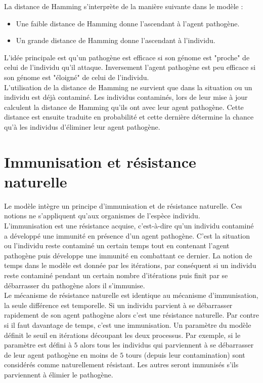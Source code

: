 La distance de Hamming s’interprète de la manière suivante dans le modèle :

\begin{itemize}
	\item Une faible distance de Hamming donne l'ascendant à l'agent pathogène.
	\item Un grande distance de Hamming donne l'ascendant à l'individu.
\end{itemize}

L'idée principale est qu'un pathogène est efficace si son génome est "proche" de celui de l'individu qu'il attaque. Inversement l'agent pathogène est peu efficace si son génome est "éloigné" de celui de l'individu.\\

L'utilisation de la distance de Hamming ne survient que dans la situation ou un individu est déjà contaminé. Les individus contaminés, lors de leur mise à jour calculent la distance de Hamming qu'ils ont avec leur agent pathogène. Cette distance est ensuite traduite en probabilité et cette dernière détermine la chance qu'à les individus d'éliminer leur agent pathogène.

\section{Immunisation et résistance naturelle}

Le modèle intègre un principe d'immunisation et de résistance naturelle. Ces notions ne s'appliquent qu'aux organismes de l'espèce individu.\\

L'immunisation est une résistance acquise, c'est-à-dire qu'un individu contaminé a développé une immunité en présence d'un agent pathogène. C'est la situation ou l'individu reste contaminé un certain temps tout en contenant l'agent pathogène puis développe une immunité en combattant ce dernier. La notion de temps dans le modèle est donnée par les itérations, par conséquent si un individu reste contaminé pendant un certain nombre d'itérations puis finit par se débarrasser du pathogène alors il s'immunise.\\

Le mécanisme de résistance naturelle est identique au mécanisme d'immunisation, la seule différence est temporelle. Si un individu parvient à se débarrasser rapidement de son agent pathogène alors c'est une résistance naturelle. Par contre si il faut davantage de temps, c'est une immunisation. Un paramètre du modèle définit le seuil en itérations découpant les deux processus. Par exemple, si le paramètre est défini à $5$ alors tous les individus qui parviennent à se débarrasser de leur agent pathogène en moins de $5$ tours (depuis leur contamination) sont considérés comme naturellement résistant. Les autres seront immunisés s'ils parviennent à élimier le pathogène.\\


